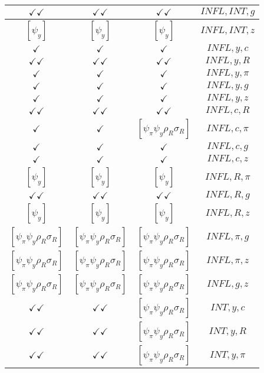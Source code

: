 \documentclass[a4paper,10pt]{article}
\begin{document}
\begin{longtable}{|c|c|c|c|}
\hline
$\checkmark\checkmark$ & $\checkmark\checkmark$ & $\checkmark\checkmark$ & ${INFL},{INT},{g}$ \\
\hline
$[\psi_y ]$ & $[\psi_y ]$ & $[\psi_y ]$ & ${INFL},{INT},{z}$ \\
\hline
$\checkmark$ & $\checkmark$ & $\checkmark$ & ${INFL},{y},{c}$ \\
\hline
$\checkmark\checkmark$ & $\checkmark\checkmark$ & $\checkmark\checkmark$ & ${INFL},{y},{R}$ \\
\hline
$\checkmark$ & $\checkmark$ & $\checkmark$ & ${INFL},{y},{\pi}$ \\
\hline
$\checkmark$ & $\checkmark$ & $\checkmark$ & ${INFL},{y},{g}$ \\
\hline
$\checkmark$ & $\checkmark$ & $\checkmark$ & ${INFL},{y},{z}$ \\
\hline
$\checkmark\checkmark$ & $\checkmark\checkmark$ & $\checkmark\checkmark$ & ${INFL},{c},{R}$ \\
\hline
$\checkmark$ & $\checkmark$ & $[\psi_\pi \psi_y \rho_R \sigma_R ]$ & ${INFL},{c},{\pi}$ \\
\hline
$\checkmark$ & $\checkmark$ & $\checkmark$ & ${INFL},{c},{g}$ \\
\hline
$\checkmark$ & $\checkmark$ & $\checkmark$ & ${INFL},{c},{z}$ \\
\hline
$[\psi_y ]$ & $[\psi_y ]$ & $[\psi_y ]$ & ${INFL},{R},{\pi}$ \\
\hline
$\checkmark\checkmark$ & $\checkmark\checkmark$ & $\checkmark\checkmark$ & ${INFL},{R},{g}$ \\
\hline
$[\psi_y ]$ & $[\psi_y ]$ & $[\psi_y ]$ & ${INFL},{R},{z}$ \\
\hline
$[\psi_\pi \psi_y \rho_R \sigma_R ]$ & $[\psi_\pi \psi_y \rho_R \sigma_R ]$ & $[\psi_\pi \psi_y \rho_R \sigma_R ]$ & ${INFL},{\pi},{g}$ \\
\hline
$[\psi_\pi \psi_y \rho_R \sigma_R ]$ & $[\psi_\pi \psi_y \rho_R \sigma_R ]$ & $[\psi_\pi \psi_y \rho_R \sigma_R ]$ & ${INFL},{\pi},{z}$ \\
\hline
$[\psi_\pi \psi_y \rho_R \sigma_R ]$ & $[\psi_\pi \psi_y \rho_R \sigma_R ]$ & $[\psi_\pi \psi_y \rho_R \sigma_R ]$ & ${INFL},{g},{z}$ \\
\hline
$\checkmark\checkmark$ & $\checkmark\checkmark$ & $[\psi_\pi \psi_y \rho_R \sigma_R ]$ & ${INT},{y},{c}$ \\
\hline
$\checkmark\checkmark$ & $\checkmark\checkmark$ & $[\psi_\pi \psi_y \rho_R \sigma_R ]$ & ${INT},{y},{R}$ \\
\hline
$\checkmark\checkmark$ & $\checkmark\checkmark$ & $[\psi_\pi \psi_y \rho_R \sigma_R ]$ & ${INT},{y},{\pi}$ \\

\end{longtable}
\end{document}
